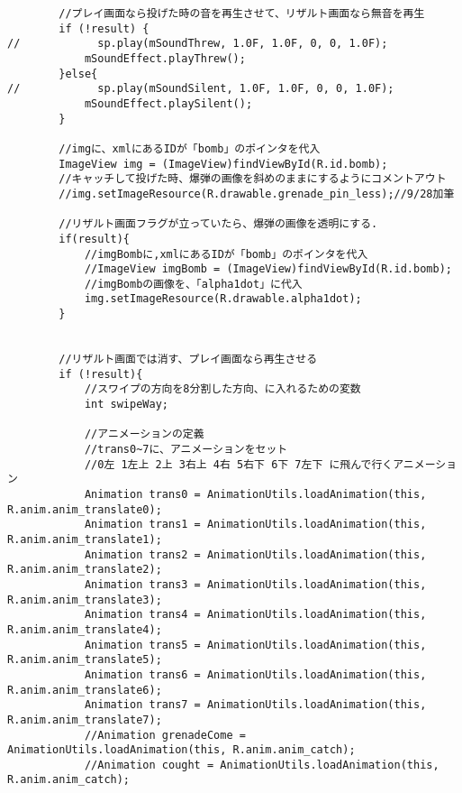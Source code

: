 \documentclass[11pt,a4j]{jarticle}
\begin{document}
\begin{verbatim}
        //プレイ画面なら投げた時の音を再生させて、リザルト画面なら無音を再生
        if (!result) {
//            sp.play(mSoundThrew, 1.0F, 1.0F, 0, 0, 1.0F);
            mSoundEffect.playThrew();
        }else{
//            sp.play(mSoundSilent, 1.0F, 1.0F, 0, 0, 1.0F);
            mSoundEffect.playSilent();
        }
        
        //imgに、xmlにあるIDが「bomb」のポインタを代入
        ImageView img = (ImageView)findViewById(R.id.bomb);
        //キャッチして投げた時、爆弾の画像を斜めのままにするようにコメントアウト
        //img.setImageResource(R.drawable.grenade_pin_less);//9/28加筆
    
        //リザルト画面フラグが立っていたら、爆弾の画像を透明にする.
        if(result){
            //imgBombに,xmlにあるIDが「bomb」のポインタを代入
            //ImageView imgBomb = (ImageView)findViewById(R.id.bomb);
            //imgBombの画像を、「alpha1dot」に代入
            img.setImageResource(R.drawable.alpha1dot);
        }


        //リザルト画面では消す、プレイ画面なら再生させる
        if (!result){
            //スワイプの方向を8分割した方向、に入れるための変数
            int swipeWay;

            //アニメーションの定義
            //trans0~7に、アニメーションをセット
            //0左 1左上 2上 3右上 4右 5右下 6下 7左下 に飛んで行くアニメーション
            Animation trans0 = AnimationUtils.loadAnimation(this, R.anim.anim_translate0);
            Animation trans1 = AnimationUtils.loadAnimation(this, R.anim.anim_translate1);
            Animation trans2 = AnimationUtils.loadAnimation(this, R.anim.anim_translate2);
            Animation trans3 = AnimationUtils.loadAnimation(this, R.anim.anim_translate3);
            Animation trans4 = AnimationUtils.loadAnimation(this, R.anim.anim_translate4);
            Animation trans5 = AnimationUtils.loadAnimation(this, R.anim.anim_translate5);
            Animation trans6 = AnimationUtils.loadAnimation(this, R.anim.anim_translate6);
            Animation trans7 = AnimationUtils.loadAnimation(this, R.anim.anim_translate7);
            //Animation grenadeCome = AnimationUtils.loadAnimation(this, R.anim.anim_catch);
            //Animation cought = AnimationUtils.loadAnimation(this, R.anim.anim_catch);


\end{verbatim}
\end{document}
